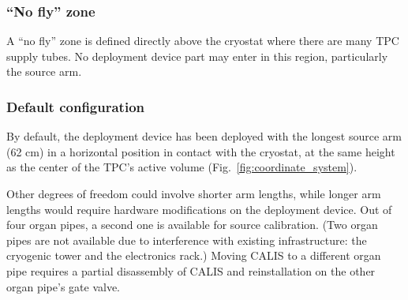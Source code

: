 \subsubsection*{``No fly'' zone}
A ``no fly'' zone is defined directly above the cryostat where there are many TPC supply tubes. No deployment device part may enter in this region, particularly the source arm.


\subsubsection*{Default configuration}
By default, the deployment device has been deployed with the longest source arm (62 cm) in a horizontal position in contact with the cryostat, at the same height as the center of the TPC's active volume (Fig.~\ref{fig:coordinate_system}). 

Other degrees of freedom could involve shorter arm lengths, while longer arm lengths would require hardware modifications on the deployment device. Out of four organ pipes, a second one is available for source calibration. (Two organ pipes are not available due to interference with existing infrastructure: the cryogenic tower and the electronics rack.) Moving CALIS to a different organ pipe requires a partial disassembly of CALIS and reinstallation on the other organ pipe's gate valve.

